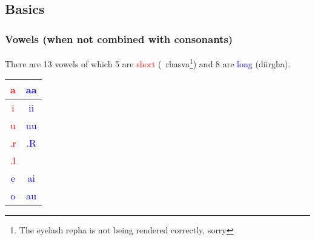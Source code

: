 \documentclass[a4paper, 12pt]{article}
\newcommand \sansletter[1]{
    \fontsize{1in}{1.2in}\selectfont 
    #1
}
\newcommand \eng[1]{
    \textenglish{#1}
}
\newcommand \shortsansletter[1]{
    \textcolor{red}{\sansletter{#1}}
}
\newcommand \longsansletter[1]{
    \textcolor{blue}{\sansletter{#1}}
}
\begin{document}
\subsection{\eng{Basics}}
\subsubsection{\eng{Vowels (when not combined with consonants)}}
\eng{
    There are 13 vowels of which 5 are \textcolor{red}{short} (\textsanskrit{~rhasva}\footnote{\eng{The eyelash repha is not being rendered correctly, sorry}}) and 8 are \textcolor{blue}{long} (\textsanskrit{diirgha}).
}
\begin{center}
\begin{tabular}{|c|c|}
\hline
    \shortsansletter{a} &
    \longsansletter{aa}\\ 
    \hline
    \shortsansletter{i} &
    \longsansletter{ii} \\
    \hline
    \shortsansletter{u} &
    \longsansletter{uu} \\
    \hline
    \shortsansletter{.r} &
    \longsansletter{.R}\\
    \hline
    \shortsansletter{.l} &
    \sansletter{ }\\
    \hline
    \longsansletter{e} &
    \longsansletter{ai}\\
    \hline
    \longsansletter{o} &
    \longsansletter{au}\\
\hline
\end{tabular}
\end{center}
\end{document}
